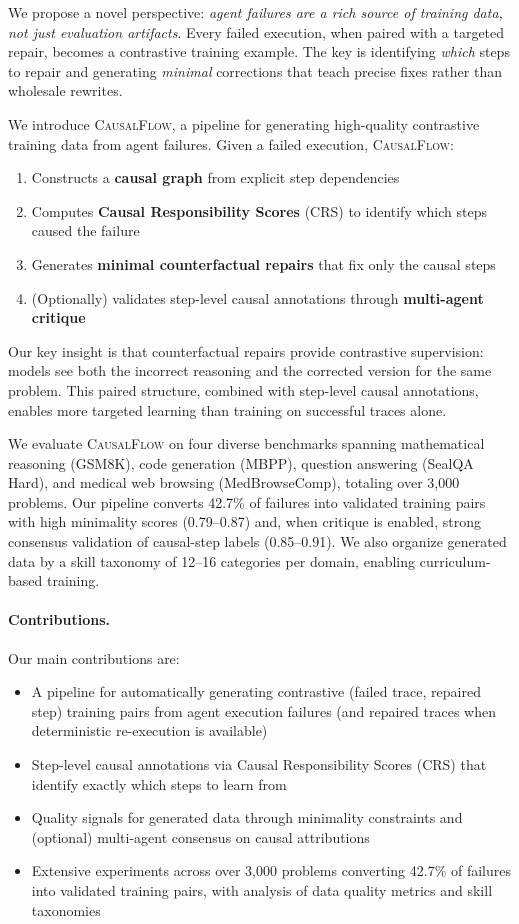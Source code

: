 \documentclass{article}
\theoremstyle{plain}
\theoremstyle{definition}
\theoremstyle{remark}
\begin{document}
We propose a novel perspective: \emph{agent failures are a rich source of training data, not just evaluation artifacts}. Every failed execution, when paired with a targeted repair, becomes a contrastive training example. The key is identifying \emph{which} steps to repair and generating \emph{minimal} corrections that teach precise fixes rather than wholesale rewrites.

We introduce \textsc{CausalFlow}, a pipeline for generating high-quality contrastive training data from agent failures. Given a failed execution, \textsc{CausalFlow}:
\begin{enumerate}
    \item Constructs a \textbf{causal graph} from explicit step dependencies
    \item Computes \textbf{Causal Responsibility Scores} (CRS) to identify which steps caused the failure
    \item Generates \textbf{minimal counterfactual repairs} that fix only the causal steps
    \item (Optionally) validates step-level causal annotations through \textbf{multi-agent critique}
\end{enumerate}

Our key insight is that counterfactual repairs provide contrastive supervision: models see both the incorrect reasoning and the corrected version for the same problem. This paired structure, combined with step-level causal annotations, enables more targeted learning than training on successful traces alone.

We evaluate \textsc{CausalFlow} on four diverse benchmarks spanning mathematical reasoning (GSM8K), code generation (MBPP), question answering (SealQA Hard), and medical web browsing (MedBrowseComp), totaling over 3{,}000 problems. Our pipeline converts 42.7\% of failures into validated training pairs with high minimality scores (0.79--0.87) and, when critique is enabled, strong consensus validation of causal-step labels (0.85--0.91). We also organize generated data by a skill taxonomy of 12--16 categories per domain, enabling curriculum-based training.

\paragraph{Contributions.} Our main contributions are:
\begin{itemize}
    \item A pipeline for automatically generating contrastive (failed trace, repaired step) training pairs from agent execution failures (and repaired traces when deterministic re-execution is available)
    \item Step-level causal annotations via Causal Responsibility Scores (CRS) that identify exactly which steps to learn from
    \item Quality signals for generated data through minimality constraints and (optional) multi-agent consensus on causal attributions
    \item Extensive experiments across over 3{,}000 problems converting 42.7\% of failures into validated training pairs, with analysis of data quality metrics and skill taxonomies
\end{itemize}
\end{document}
